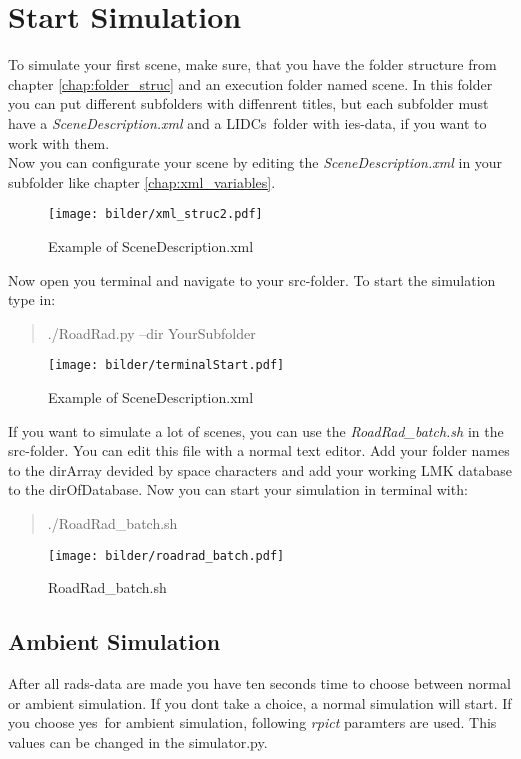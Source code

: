 \documentclass[10pt,a4paper]{report}
\begin{document}
\chapter{Start Simulation}

To simulate your first scene, make sure, that you have the folder structure from chapter \ref{chap:folder_struc} and an execution folder named \glqq scene\grqq. In this folder you can put different subfolders with diffenrent titles, but each subfolder must have a \textit{SceneDescription.xml} and a \glqq LIDCs\grqq\ folder with ies-data, if you want to work with them.\\
Now you can configurate your scene by editing the \textit{SceneDescription.xml} in your subfolder like chapter \ref{chap:xml_variables}.

\begin{figure}[H]
\texttt{[image: bilder/xml\_struc2.pdf]} 
\caption{Example of SceneDescription.xml}
\end{figure}

Now open you terminal and navigate to your src-folder. To start the simulation type in:

\begin{quote}
./RoadRad.py --dir YourSubfolder
\end{quote}

\begin{figure}[H]
\centering
\texttt{[image: bilder/terminalStart.pdf]} 
\caption{Example of SceneDescription.xml}
\end{figure}

If you want to simulate a lot of scenes, you can use the \textit{RoadRad\_batch.sh} in the src-folder. You can edit this file with a normal text editor. Add your folder names to the dirArray devided by space characters and add your working LMK database to the dirOfDatabase. Now you can start your simulation in terminal with:

\begin{quote}
./RoadRad\_batch.sh
\end{quote}

\begin{figure}[H]
\texttt{[image: bilder/roadrad\_batch.pdf]} 
\caption{RoadRad\_batch.sh}
\end{figure}

\section{Ambient Simulation}
After all rads-data are made you have ten seconds time to choose between normal or ambient simulation. If you dont take a choice, a normal simulation will start. If you choose \glqq yes\grqq\ for ambient simulation, following \textit{rpict} paramters are used.
This values can be changed in the simulator.py.
\end{document}
